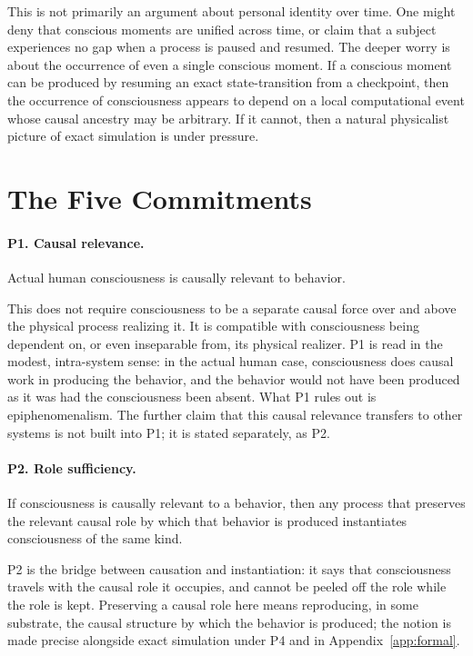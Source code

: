 \documentclass[11pt]{article}
\begin{document}
This is not primarily an argument about personal identity over time. One might
deny that conscious moments are unified across time, or claim that a subject
experiences no gap when a process is paused and resumed. The deeper worry is
about the occurrence of even a single conscious moment. If a conscious moment
can be produced by resuming an exact state-transition from a checkpoint, then
the occurrence of consciousness appears to depend on a local computational
event whose causal ancestry may be arbitrary. If it cannot, then a natural
physicalist picture of exact simulation is under pressure.

\section{The Five Commitments}
\label{sec:commitments}

\paragraph{P1. Causal relevance.}
Actual human consciousness is causally relevant to behavior.

This does not require consciousness to be a separate causal force over and
above the physical process realizing it. It is compatible with consciousness
being dependent on, or even inseparable from, its physical realizer. P1 is
read in the modest, intra-system sense: in the actual human case,
consciousness does causal work in producing the behavior, and the behavior
would not have been produced as it was had the consciousness been absent. What
P1 rules out is epiphenomenalism. The further claim that this causal relevance
transfers to other systems is not built into P1; it is stated separately, as
P2.

\paragraph{P2. Role sufficiency.}
If consciousness is causally relevant to a behavior, then any process that
preserves the relevant causal role by which that behavior is produced
instantiates consciousness of the same kind.

P2 is the bridge between causation and instantiation: it says that
consciousness travels with the causal role it occupies, and cannot be peeled
off the role while the role is kept. Preserving a causal role here means
reproducing, in some substrate, the causal structure by which the behavior is
produced; the notion is made precise alongside exact simulation under P4 and
in Appendix~\ref{app:formal}.
\end{document}
